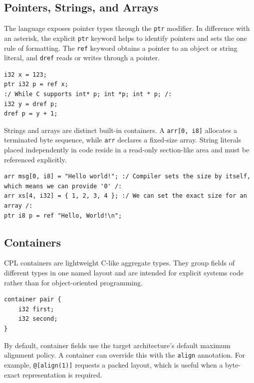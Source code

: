 \documentclass[10pt,twocolumn]{article}
\begin{document}
\subsection{Pointers, Strings, and Arrays}
\par The language exposes pointer types through the \texttt{ptr} modifier. In difference with an asterisk, the explicit \texttt{ptr} keyword helps to identify pointers and sets the one rule of formatting. The \texttt{ref} keyword obtains a pointer to an object or string literal, and \texttt{dref} reads or writes through a pointer.

\begin{lstlisting}[language=CPL,caption={Pointer operations in CPL.}]
i32 x = 123;
ptr i32 p = ref x;
:/ While C supports int* p; int *p; int * p; /:
i32 y = dref p;
dref p = y + 1;
\end{lstlisting}

\par Strings and arrays are distinct built-in containers. A \texttt{arr[0, i8]} allocates a terminated byte sequence, while \texttt{arr} declares a fixed-size array. String literals placed independently in code reside in a read-only section-like area and must be referenced explicitly.

\begin{lstlisting}[language=CPL,caption={Strings and arrays.}]
arr msg[0, i8] = "Hello world!"; :/ Compiler sets the size by itself, which means we can provide '0' /:
arr xs[4, i32] = { 1, 2, 3, 4 }; :/ We can set the exact size for an array /:
ptr i8 p = ref "Hello, World!\n";
\end{lstlisting}

\subsection{Containers}

\par CPL containers are lightweight C-like aggregate types. They group fields of different types in one named layout and are intended for explicit systems code rather than for object-oriented programming.

\begin{lstlisting}[language=CPL,caption={A simple CPL container.}]
container pair {
    i32 first;
    i32 second;
}
\end{lstlisting}

\par By default, container fields use the target architecture's default maximum alignment policy. A container can override this with the \texttt{align} annotation. For example, \texttt{@[align(1)]} requests a packed layout, which is useful when a byte-exact representation is required.
\end{document}
